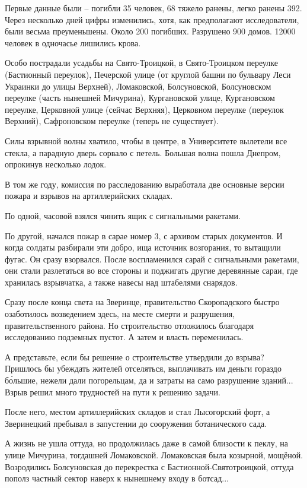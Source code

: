 Первые данные были – погибли 35 человек, 68 тяжело ранены, легко ранены 392. Через несколько дней цифры изменились, хотя, как предполагают исследователи, были весьма преуменьшены. Около 200 погибших. Разрушено 900 домов. 12000 человек в одночасье лишились крова.

Особо пострадали усадьбы на Свято-Троицкой, в Свято-Троицком переулке (Бастионный переулок), Печерской улице (от круглой башни по бульвару Леси Украинки до улицы Верхней), Ломаковской, Болсуновской,  Болсуновском переулке (часть нынешней Мичурина), Кургановской улице, Кургановском переулке, Церковной улице (сейчас Верхняя), Церковном переулке (переулок Верхний), Сафроновском переулке (теперь не существует).

Силы взрывной волны хватило, чтобы в центре, в Университете вылетели все стекла, а парадную дверь сорвало с петель. Большая волна пошла Днепром, опрокинув несколько лодок.

В том же году, комиссия по расследованию выработала две основные версии пожара и взрывов на артиллерийских складах. 

По одной, часовой взялся чинить ящик с сигнальными ракетами. 

По другой, начался пожар в сарае номер 3, с архивом старых документов. И когда солдаты разбирали эти добро, ища источник возгорания, то вытащили фугас. Он сразу взорвался. После воспламенился сарай с сигнальными ракетами, они стали разлетаться во все стороны и поджигать другие деревянные сараи, где хранилась взрывчатка, а также навесы над штабелями снарядов.

   Сразу после конца света на Зверинце, правительство Скоропадского быстро озаботилось возведением здесь, на месте смерти и разрушения, правительственного района. Но строительство отложилось благодаря исследованию подземных пустот. А затем и власть переменилась.

   А представьте, если бы решение о строительстве утвердили до взрыва? Пришлось бы убеждать жителей отселяться, выплачивать им деньги гораздо б\'ольшие, нежели дали погорельцам, да и затраты на само разрушение зданий... Взрыв решил много трудностей на пути к решению задачи.

После него, местом артиллерийских складов и стал Лысогорский форт, а Зверинецкий пребывал в запустении до сооружения ботанического сада. 

А жизнь не ушла оттуда, но продолжилась даже в самой близости к пеклу, на улице Мичурина, тогдашней Ломаковской. Ломаковская была козырной, мощёной. Возродились Болсуновская до перекрестка с Бастионной-Святотроицкой,  оттуда пополз частный сектор наверх к нынешнему входу в ботсад...

